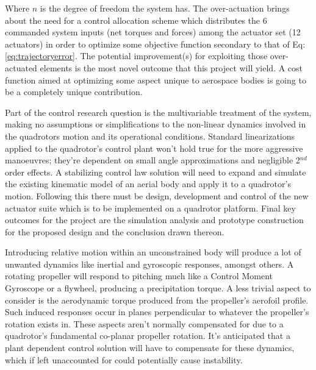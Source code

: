 Where $n$ is the degree of freedom the system has. The over-actuation brings about the need for a control allocation scheme which distributes the 6 commanded system inputs (net torques and forces) among the actuator set (12 actuators) in order to optimize some objective function secondary to that of Eq:\ref{eq:trajectoryerror}. The potential improvement(s) for exploiting those over-actuated elements is the most novel outcome that this project will yield. A cost function aimed at optimizing some aspect unique to aerospace bodies is going to be a completely unique contribution.
\par
Part of the control research question is the multivariable treatment of the system, making no assumptions or simplifications to the non-linear dynamics involved in the quadrotors motion and its operational conditions. Standard linearizations applied to the quadrotor's control plant won't hold true for the more aggressive manoeuvres; they're dependent on small angle approximations and negligible 2$^{nd}$ order effects. A stabilizing control law solution will need to expand and simulate the existing kinematic model of an aerial body and apply it to a quadrotor's motion. Following this there must be design, development and control of the new actuator suite which is to be implemented on a quadrotor platform. Final key outcomes for the project are the simulation analysis and prototype construction for the proposed design and the conclusion drawn thereon.
\par
Introducing relative motion within an unconstrained body will produce a lot of unwanted dynamics like inertial and gyroscopic responses, amongst others. A rotating propeller will respond to pitching much like a Control Moment Gyroscope \cite{cmg} or a flywheel, producing a precipitation torque. A less trivial aspect to consider is the aerodynamic torque produced from the propeller's aerofoil profile. Such induced responses occur in planes perpendicular to whatever the propeller's rotation exists in. These aspects aren't normally compensated for due to a quadrotor's fundamental co-planar propeller rotation. It's anticipated that a plant dependent control solution will have to compensate for these dynamics, which if left unaccounted for could potentially cause instability.
